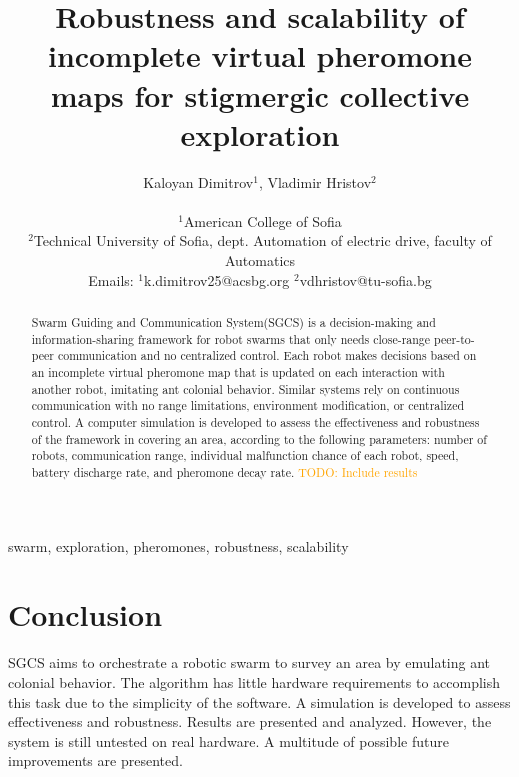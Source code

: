 \documentclass[a4paper, 11pt]{article}
\title{Robustness and scalability of incomplete virtual pheromone maps for stigmergic collective exploration}
\author{
Kaloyan Dimitrov$^{1}$, Vladimir Hristov$^{2}$\\
\begin{footnotesize}
$^{1}$American College of Sofia\\
$^{2}$Technical University of Sofia, dept. Automation of electric drive, faculty of Automatics\\
Emails: $^{1}$k.dimitrov25@acsbg.org $^{2}$vdhristov@tu-sofia.bg
\end{footnotesize}
}
\date{}
\makeatletter
\newcommand{\todo}[1]{\textcolor{orange}{TODO: #1}}
\renewcommand{\maketitle}{\bgroup\setlength{\parindent}{0pt}
\begin{flushleft}
  \Large\@title \par
  \large \textit{\@author}
\end{flushleft}\egroup
}
\makeatother
\begin{document}
\maketitle
\begin{abstract}
Swarm Guiding and Communication System(SGCS) is a decision-making and information-sharing framework for robot swarms that only needs close-range peer-to-peer communication and no centralized control. Each robot makes decisions based on an incomplete virtual pheromone map that is updated on each interaction with another robot, imitating ant colonial behavior. Similar systems rely on continuous communication with no range limitations, environment modification, or centralized control. A computer simulation is developed to assess the effectiveness and robustness of the framework in covering an area, according to the following parameters: number of robots, communication range, individual malfunction chance of each robot, speed, battery discharge rate, and pheromone decay rate. \todo{Include results}
\end{abstract}
\begin{keywords}
swarm, exploration, pheromones, robustness, scalability
\end{keywords}







\section{Conclusion}
SGCS aims to orchestrate a robotic swarm to survey an area by emulating ant colonial behavior. The algorithm has little hardware requirements to accomplish this task due to the simplicity of the software. A simulation is developed to assess effectiveness and robustness. Results are presented and analyzed. However, the system is still untested on real hardware. A multitude of possible future improvements are presented. 
\printbibliography
\end{document}
